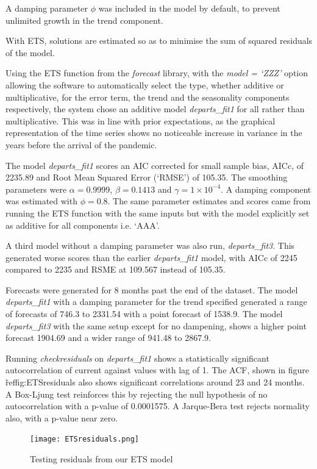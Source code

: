 \documentclass[9pt,technote]{IEEEtran}
\begin{document}
A damping parameter $\phi$ was included in the model by default, to prevent unlimited growth in the trend component. 

With ETS, solutions are estimated so as to minimise the sum of squared residuals of the model.  

Using the ETS function from the \textit{forecast} library, with the \textit{model = `ZZZ'} option allowing the software to automatically select the type, whether additive or multiplicative, for the error term, the trend and the seasonality components respectively, the system chose an additive model \textit{departs\_fit1} for all rather than multiplicative.  This was in line with prior expectations, as the graphical representation of the time series shows no noticeable increase in variance in the years before the arrival of the pandemic.  

The model \textit{departs\_fit1} scores an AIC corrected for small sample bias, AICc, of 2235.89 and Root Mean Squared Error (`RMSE') of 105.35.  The smoothing parameters were $\alpha = 0.9999$, $\beta = 0.1413$ and $\gamma = 1 \times 10^{-4}$.  A damping component was estimated with $\phi = 0.8$.  The same parameter estimates and scores came from running the ETS function with the same inputs but with the model explicitly set as additive for all components i.e. `AAA'.  

A third model without a damping parameter was also run, \textit{departs\_fit3}.  This generated worse scores than the earlier \textit{departs\_fit1} model, with AICc of 2245 compared to 2235 and RSME at 109.567 instead of 105.35.  

Forecasts were generated for 8 months past the end of the dataset.  The model \textit{departs\_fit1} with a damping parameter for the trend specified generated a range of forecasts of 746.3 to 2331.54 with a point forecast of 1538.9.  The model \textit{departs\_fit3} with the same setup except for no dampening, shows a higher point forecast 1904.69 and a wider range of 941.48 to 2867.9.  

Running \textit{checkresiduals} on \textit{departs\_fit1} shows a statistically significant autocorrelation of current against values with lag of 1.  The ACF, shown in figure \~ref{fig:ETSresiduals} also shows significant correlations around 23 and 24 months. A Box-Ljung test reinforces this by rejecting the null hypothesis of no autocorrelation with a p-value of 0.0001575.  A Jarque-Bera test rejects normality also, with a p-value near zero. 

\begin{figure}[htbp]
\centerline{\texttt{[image: ETSresiduals.png]}}
\caption{Testing residuals from our ETS model}
\label{fig:ETSresiduals}
\end{figure}
\end{document}
